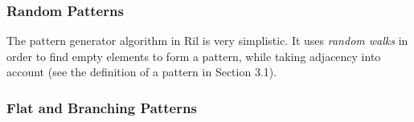 \documentclass{llncs}
\begin{document}
\subsubsection{Random Patterns}

The pattern generator algorithm in Ril is very simplistic. It uses \emph{random walks} in order to find empty elements to form a pattern, while taking adjacency into account (see the definition of a pattern in Section 3.1).

\subsubsection{Flat and Branching Patterns}
\end{document}
